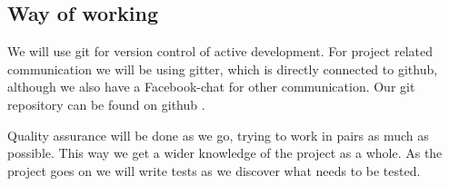 \subsection{Way of working}
We will use git for version control of active development. For project related communication we will be using gitter, which is directly connected to github, although we also have a Facebook-chat for other communication. Our git repository can be found on github .

Quality assurance will be done as we go, trying to work in pairs as much as possible. This way we get a wider knowledge of the project as a whole. As the project goes on we will write tests as we discover what needs to be tested. 